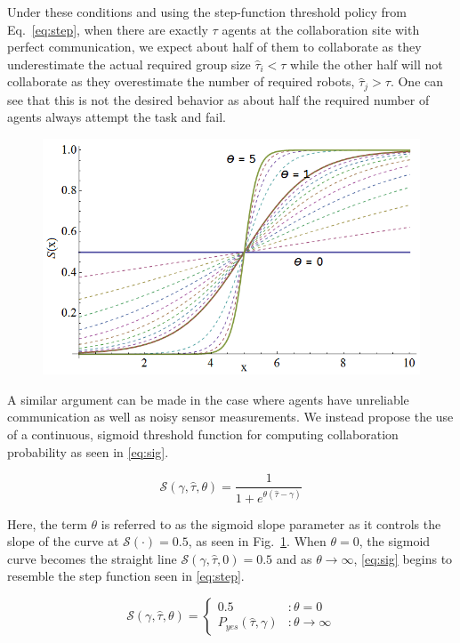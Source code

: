 \documentclass[conference]{ieeeconf}
\def\estt{\hat{\tau}}
\def\estg{\gamma}
\newcommand{\sig}{\mathcal{S}}
\begin{document}
Under these conditions and using the step-function threshold policy from Eq.~\ref{eq:step}, when there are exactly $\tau$ agents at the collaboration site with perfect communication, we expect about half of them to collaborate as they underestimate the actual required group size $\estt_i < \tau$ while the other half will not collaborate as they overestimate the number of required robots, $\estt_j > \tau$. One can see that this is not the desired behavior as about half the required number of agents always attempt the task and fail.

\begin{figure}[!ht]
\centering\includegraphics[width=\columnwidth]{../figures/sigmoid1.png}
\centering\caption{}\label{fig:sigmoid}
\end{figure}

A similar argument can be made in the case where agents have unreliable communication as well as noisy sensor measurements. We instead propose the use of a continuous, sigmoid threshold function for computing collaboration probability as seen in \eqref{eq:sig}.

\begin{equation}\label{eq:sig}
	\sig(\estg, \estt, \theta) = \frac{1}{1 + e^{\theta(\estt - \estg)}}
\end{equation}

Here, the term $\theta$ is referred to as the sigmoid slope parameter as it controls the slope of the curve at $\sig(\cdot) = 0.5$, as seen in Fig.~\ref{fig:sigmoid}. When $\theta = 0$, the sigmoid curve becomes the straight line $\sig(\estg, \estt, 0) = 0.5$ and as $\theta \to \infty$, \eqref{eq:sig} begins to resemble the step function seen in \eqref{eq:step}.

\begin{equation}
	\sig(\estg, \estt, \theta) =  \left\{
	\begin{array}{ll}
		0.5 & : \theta = 0\\ 
		P_{yes}(\estt,\estg) & : \theta \to \infty
	\end{array}\right.
\end{equation}
\end{document}
